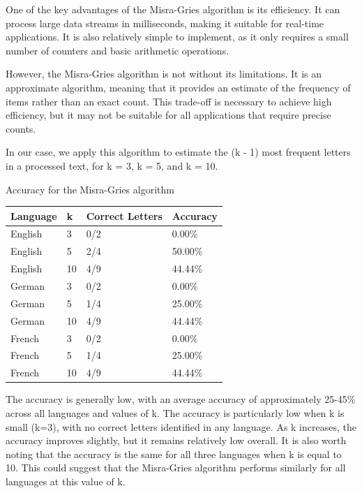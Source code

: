 \documentclass[]{revdetua}
\begin{document}
One of the key advantages of the Misra-Gries algorithm is its efficiency. It can process large data streams in milliseconds, making it suitable for real-time applications. It is also relatively simple to implement, as it only requires a small number of counters and basic arithmetic operations. 

However, the Misra-Gries algorithm is not without its limitations. It is an approximate algorithm, meaning that it provides an estimate of the frequency of items rather than an exact count. This trade-off is necessary to achieve high efficiency, but it may not be suitable for all applications that require precise counts.

In our case, we apply this algorithm to estimate the (k - 1) most frequent letters in a processed text, for k = 3, k = 5, and k = 10.

\begin{table}[!ht]
    \centering
    Accuracy for the Misra-Gries algorithm
    \begin{tabular}{|l|l|l|l|}
    \hline
        Language & k & Correct Letters & Accuracy \\ \hline
        English & 3 & 0/2 & 0.00\% \\ \hline
        English & 5 & 2/4 & 50.00\% \\ \hline
        English & 10 & 4/9 & 44.44\% \\ \hline
        German & 3 & 0/2 & 0.00\% \\ \hline
        German & 5 & 1/4 & 25.00\% \\ \hline
        German & 10 & 4/9 & 44.44\% \\ \hline
        French & 3 & 0/2 & 0.00\% \\ \hline
        French & 5 & 1/4 & 25.00\% \\ \hline
        French & 10 & 4/9 & 44.44\% \\ \hline
    \end{tabular}
\end{table}

The accuracy is generally low, with an average accuracy of approximately 25-45\% across all languages and values of k. The accuracy is particularly low when k is small (k=3), with no correct letters identified in any language. As k increases, the accuracy improves slightly, but it remains relatively low overall. It is also worth noting that the accuracy is the same for all three languages when k is equal to 10. This could suggest that the Misra-Gries algorithm performs similarly for all languages at this value of k.
\end{document}
